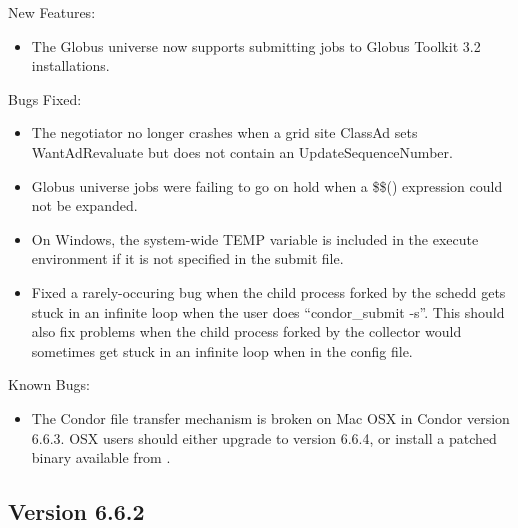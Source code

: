 \noindent New Features:

\begin{itemize}

\item The Globus universe now supports submitting jobs to Globus Toolkit 3.2 installations.

\end{itemize}

\noindent Bugs Fixed:

\begin{itemize}

\item The negotiator no longer crashes when a grid site ClassAd sets WantAdRevaluate but does not contain an UpdateSequenceNumber.

\item Globus universe jobs were failing to go on hold when a \$\$() expression
could not be expanded.

\item On Windows, the system-wide TEMP variable is included in the
execute environment if it is not specified in the submit file.

\item Fixed a rarely-occuring bug when  the child process forked by the schedd gets stuck in an infinite loop when the user does ``condor\_submit -s''. This should also fix problems when the child process forked by the collector would sometimes get stuck in an infinite loop when  in the config file.

\end{itemize}

\noindent Known Bugs:

\begin{itemize}

\item The Condor file transfer mechanism is broken on Mac OSX in
  Condor version 6.6.3.
  OSX users should either upgrade to version 6.6.4, or install a
  patched  binary available from
  . 

\end{itemize}






\subsection{\label{sec:New-6-6-2}Version 6.6.2}

